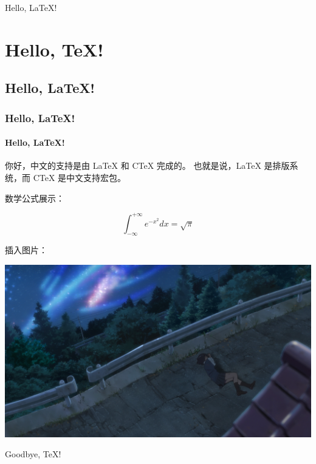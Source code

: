 \documentclass{article}
\begin{document}
    Hello, \LaTeX!

    \section{Hello, \TeX!}
    \subsection{Hello, \LaTeX!}
    \subsubsection{Hello, \LaTeX!}
    \paragraph{Hello, \LaTeX!}

    你好，中文的支持是由 \LaTeX{} 和 C\TeX{} 完成的。
    也就是说，\LaTeX{} 是排版系统，而 C\TeX{} 是中文支持宏包。

    

    数学公式展示：

    $$
    \int_{-\infty}^{+\infty} e^{-x^2} dx = \sqrt{\pi}
    $$

    \lipsum[2]

    插入图片：

    \begin{center}
        \includegraphics[width=1\textwidth]{image/Your_name.png}
    \end{center}

    Goodbye, \TeX! 
\end{document}
